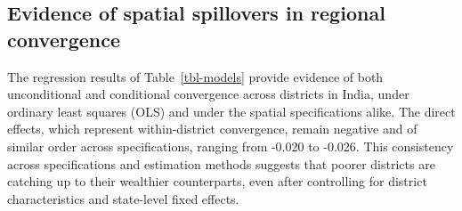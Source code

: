 \documentclass[
  a4paper, 
  twoside,
  final
]{article}
\begin{document}
\subsection{Evidence of spatial spillovers in regional
convergence}\label{evidence-of-spatial-spillovers-in-regional-convergence}

The regression results of Table~\ref{tbl-models} provide evidence of
both unconditional and conditional convergence across districts in
India, under ordinary least squares (OLS) and under the spatial
specifications alike. The direct effects, which represent
within-district convergence, remain negative and of similar order across
specifications, ranging from -0.020 to -0.026. This consistency across
specifications and estimation methods suggests that poorer districts are
catching up to their wealthier counterparts, even after controlling for
district characteristics and state-level fixed effects.

\begingroup\footnotesize\setlength{\tabcolsep}{3pt}
\end{document}
